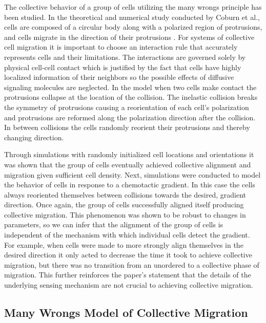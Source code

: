 \documentclass[phys,prelim]{puthesis}
\begin{document}
The collective behavior of a group of cells utilizing the many wrongs principle has been studied. In the theoretical and numerical study conducted by Coburn et al., cells are composed of a circular body along with a polarized region of protrusions, and cells migrate in the direction of their protrusions \cite{coburn2013tactile}. For systems of collective cell migration it is important to choose an interaction rule that accurately represents cells and their limitations. The interactions are governed solely by physical cell-cell contact which is justified by the fact that cells have highly localized information of their neighbors so the possible effects of diffusive signaling molecules are neglected. In the model when two cells make contact the protrusions collapse at the location of the collision. The inelastic collision breaks the symmetry of protrusions causing a reorientation of each cell's polarization and protrusions are reformed along the polarization direction after the collision. In between collisions the cells randomly reorient their protrusions and thereby changing direction.

Through simulations with randomly initialized cell locations and orientations it was shown that the group of cells eventually achieved collective alignment and migration given sufficient cell density. Next, simulations were conducted to model the behavior of cells in response to a chemotactic gradient. In this case the cells always reoriented themselves between collisions towards the desired, gradient direction. Once again, the group of cells successfully aligned itself producing collective migration. This phenomenon was shown to be robust to changes in parameters, so we can infer that the alignment of the group of cells is independent of the mechanism with which individual cells detect the gradient. For example, when cells were made to more strongly align themselves in the desired direction it only acted to decrease the time it took to achieve collective migration, but there was no transition from an unordered to a collective phase of migration. This further reinforces the paper's statement that the details of the underlying sensing mechanism are not crucial to achieving collective migration.

\subsection{Many Wrongs Model of Collective Migration}
\end{document}
